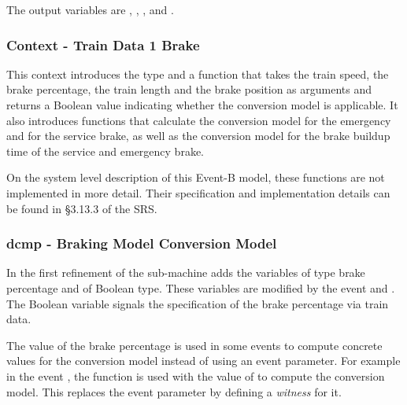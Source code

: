\documentclass{template/openetcs_article}
\begin{document}
{The output variables are , ,
,  and
.

{\footnotesize

}

\subsubsection{Context - Train Data 1 Brake}
\label{sec:context-train-data}

This context introduces the type  and a function
that takes the train speed, the brake percentage, the train length and the brake
position as arguments and returns a Boolean value indicating whether the
conversion model is applicable. It also introduces functions that calculate the
conversion model for the emergency and for the service brake, as well as the
conversion model for the brake buildup time of the service and emergency brake.

On the system level description of this Event-B model, these functions are not
implemented in more detail. Their specification and implementation details can
be found in §3.13.3 of the SRS.


{\footnotesize

}

\subsubsection{dcmp - Braking Model Conversion Model}
\label{sec:dcmp-braking-model-1}

In the first refinement of the sub-machine adds the variables
 of type brake percentage and
 of Boolean type. These variables are
modified by the event  and
. The Boolean variable signals the
specification of the brake percentage via train data.

The value of the brake percentage is used in some events to compute concrete
values for the conversion model instead of using an event parameter. For example
in the event , the function
 is used with the value
of to compute the conversion model. This replaces the
event parameter  by defining a \emph{witness} for it.

}
\end{document}
